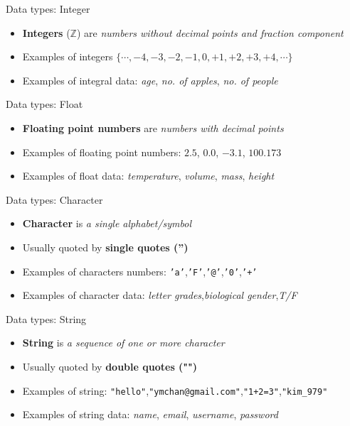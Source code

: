\documentclass[10pt,xcolor={table,dvipsnames},t]{beamer}
\begin{document}
\begin{frame}{Data types: Integer}
  \begin{itemize}
    \item \textbf{Integers} ($\mathbb{Z}$) are \textit{numbers without decimal points and fraction component}
    \item  Examples of integers $\{\cdots, -4, -3, -2, -1 , 0, +1, +2, +3, +4, \cdots\}$
    \item Examples of integral data: \textit{age}, \textit{no. of apples}, \textit{no. of people}
  \end{itemize}
\end{frame}

\begin{frame}{Data types: Float}
  \begin{itemize}
    \item \textbf{Floating point numbers} are \textit{numbers with decimal points}
    \item  Examples of floating point numbers: $2.5$, $0.0$, $-3.1$, $100.173$
    \item Examples of float data: \textit{temperature}, \textit{volume}, \textit{mass}, \textit{height}
  \end{itemize}
\end{frame}

\begin{frame}{Data types: Character}
  \begin{itemize}
    \item \textbf{Character} is \textit{a single alphabet/symbol}
    \item Usually quoted by \textbf{single quotes ('')}
    \item Examples of characters numbers: \texttt{'a'},\texttt{'F'},\texttt{'@'},\texttt{'0'},\texttt{'+'}
    \item Examples of character data: \textit{letter grades},\textit{biological gender},\textit{T/F}
  \end{itemize}
\end{frame}

\begin{frame}{Data types: String}
  \begin{itemize}
    \item \textbf{String} is \textit{a sequence of one or more character}
    \item Usually quoted by \textbf{double quotes ("")}
    \item Examples of string: \texttt{"hello"},\texttt{"ymchan@gmail.com"},\texttt{"1+2=3"},\texttt{"kim\_979"}
    \item Examples of string data: \textit{name}, \textit{email}, \textit{username}, \textit{password}
  \end{itemize}
\end{frame}
\end{document}
